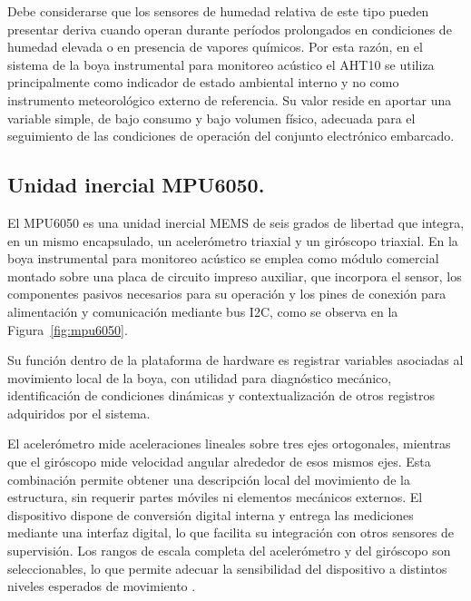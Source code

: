 Debe considerarse que los sensores de humedad relativa de este tipo pueden presentar deriva cuando operan durante períodos prolongados en condiciones de humedad elevada o en presencia de vapores químicos. Por esta razón, en el sistema de la boya instrumental para monitoreo acústico el AHT10 se utiliza principalmente como indicador de estado ambiental interno y no como instrumento meteorológico externo de referencia. Su valor reside en aportar una variable simple, de bajo consumo y bajo volumen físico, adecuada para el seguimiento de las condiciones de operación del conjunto electrónico embarcado.

\subsection{Unidad inercial MPU6050.}

El MPU6050 es una unidad inercial MEMS de seis grados de libertad que integra, en un mismo encapsulado, un acelerómetro triaxial y un giróscopo triaxial. En la boya instrumental para monitoreo acústico se emplea como módulo comercial montado sobre una placa de circuito impreso auxiliar, que incorpora el sensor, los componentes pasivos necesarios para su operación y los pines de conexión para alimentación y comunicación mediante bus I2C, como se observa en la Figura~\ref{fig:mpu6050}. 

Su función dentro de la plataforma de hardware es registrar variables asociadas al movimiento local de la boya, con utilidad para diagnóstico mecánico, identificación de condiciones dinámicas y contextualización de otros registros adquiridos por el sistema.

El acelerómetro mide aceleraciones lineales sobre tres ejes ortogonales, mientras que el giróscopo mide velocidad angular alrededor de esos mismos ejes. Esta combinación permite obtener una descripción local del movimiento de la estructura, sin requerir partes móviles ni elementos mecánicos externos. El dispositivo dispone de conversión digital interna y entrega las mediciones mediante una interfaz digital, lo que facilita su integración con otros sensores de supervisión. Los rangos de escala completa del acelerómetro y del giróscopo son seleccionables, lo que permite adecuar la sensibilidad del dispositivo a distintos niveles esperados de movimiento \citep{MPU6050Datasheet}.


